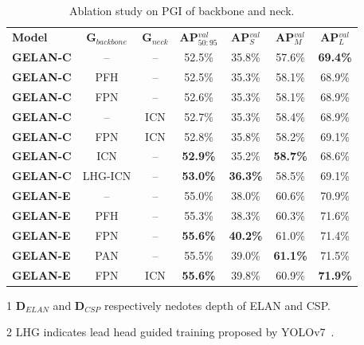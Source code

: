 \documentclass[10pt,twocolumn,letterpaper]{article}
\begin{document}
	\begin{table}[h]
		\centering
		\begin{threeparttable}[h]
			\footnotesize
			\caption{Ablation study on PGI of backbone and neck.}
			\label{table:pgi}
			\setlength\tabcolsep{3.0pt}
			\begin{tabular}{lcccccc}
				\toprule
				\textbf{Model} & \textbf{G$_{backbone}$} & \textbf{G$_{neck}$} & \textbf{AP$^{val}_{50:95}$} & \textbf{AP$^{val}_{S}$} & \textbf{AP$^{val}_{M}$} & \textbf{AP$^{val}_{L}$} \\
				\textbf{GELAN-C} & -- & -- & 52.5\% & 35.8\% & 57.6\% & \textbf{69.4\%} \\
				\textbf{GELAN-C} & PFH & -- & 52.5\% & 35.3\% & 58.1\% & 68.9\% \\
				\textbf{GELAN-C} & FPN & -- & 52.6\% & 35.3\% & 58.1\% & 68.9\% \\
				\textbf{GELAN-C} & -- & ICN & 52.7\% & 35.3\% & 58.4\% & 68.9\% \\
				\textbf{GELAN-C} & FPN & ICN & 52.8\% & 35.8\% & 58.2\% & 69.1\% \\	
				\textbf{GELAN-C} & ICN & -- & \textbf{52.9\%} & 35.2\% & \textbf{58.7\%} & 68.6\% \\
				\textbf{GELAN-C} & LHG-ICN & -- & \textbf{53.0\%} & \textbf{36.3\%} & 58.5\% & 69.1\% \\
				\midrule
				\textbf{GELAN-E} & -- & -- & 55.0\% & 38.0\% & 60.6\% & 70.9\% \\
				\textbf{GELAN-E} & PFH & -- & 55.3\% & 38.3\% & 60.3\% & 71.6\% \\
				\textbf{GELAN-E} & FPN & -- & \textbf{55.6\%} & \textbf{40.2\%} & 61.0\% & 71.4\% \\
				\textbf{GELAN-E} & PAN & -- & 55.5\% & 39.0\% & \textbf{61.1\%} & 71.5\% \\
				\textbf{GELAN-E} & FPN & ICN & \textbf{55.6\%} & 39.8\% & 60.9\% & \textbf{71.9\%} \\
				\bottomrule
			\end{tabular}
			\begin{tablenotes}[flushleft]
				\footnotesize
				\item[1] \textbf{D$_{ELAN}$} and \textbf{D$_{CSP}$} respectively nedotes depth of ELAN and CSP.
				\item[2] LHG indicates lead head guided training proposed by YOLOv7~\cite{wang2023yolov7}.
			\end{tablenotes}
		\end{threeparttable}
	\end{table}
	
\end{document}
